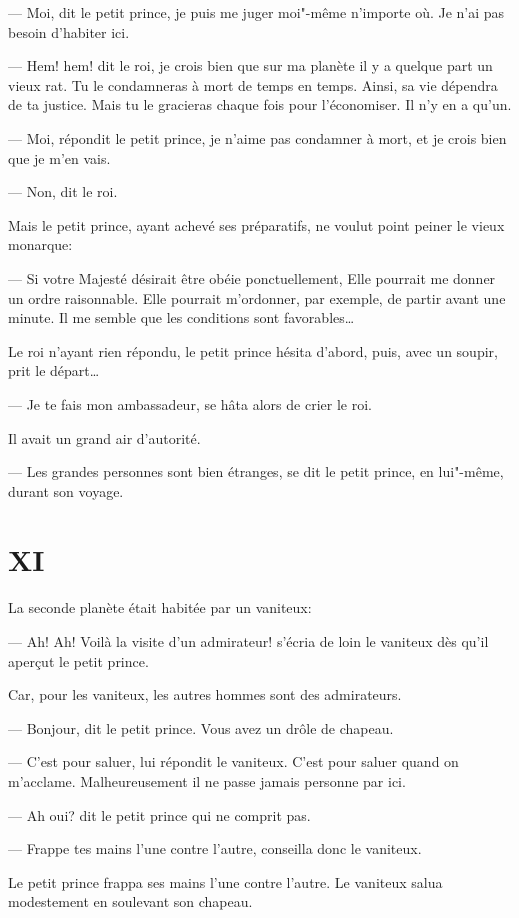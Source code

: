 \begin{Parallel}[p]{}{}
{--- Moi, dit le petit prince, je puis me juger moi"-même n'importe où. Je n'ai pas besoin d'habiter ici.

--- Hem! hem! dit le roi, je crois bien que sur ma
planète il y a quelque part un vieux rat. Tu le condamneras à mort de temps en temps. Ainsi, sa vie dépendra de ta justice. Mais tu le gracieras chaque fois
pour l'économiser. Il n'y en a qu'un.

--- Moi, répondit le petit prince, je n'aime pas
condamner à mort, et je crois bien que je m'en vais.

--- Non, dit le roi.

Mais le petit prince, ayant achevé ses préparatifs,
ne voulut point peiner le vieux monarque:

--- Si votre Majesté désirait être obéie ponctuellement, Elle pourrait me donner un ordre raisonnable. Elle pourrait m'ordonner, par exemple, de partir avant une minute. Il me semble que les conditions sont favorables\ldots{}

Le roi n'ayant rien répondu, le petit prince hésita
d'abord, puis, avec un soupir, prit le départ\ldots{}

--- Je te fais mon ambassadeur, se hâta alors de
crier le roi.

Il avait un grand air d'autorité.

--- Les grandes personnes sont bien étranges, se
dit le petit prince, en lui"-même, durant son voyage.

\section{XI}

La seconde planète était habitée par un vaniteux:

--- Ah! Ah! Voilà la visite d'un admirateur! s'écria de loin le vaniteux dès qu'il aperçut le petit prince.

Car, pour les vaniteux, les autres hommes sont des admirateurs.

--- Bonjour, dit le petit prince. Vous avez un drôle de chapeau.

--- C'est pour saluer, lui répondit le vaniteux. C'est
pour saluer quand on m'acclame. Malheureusement il ne
passe jamais personne par ici.

--- Ah oui? dit le petit prince qui ne comprit pas.

--- Frappe tes mains l'une contre l'autre, conseilla donc le vaniteux.

Le petit prince frappa ses mains l'une contre l'autre. Le vaniteux salua
modestement en soulevant son chapeau.

}
\end{Parallel}
